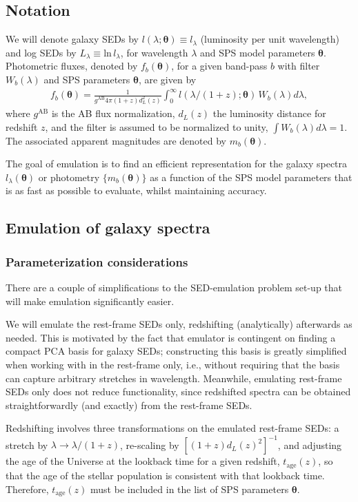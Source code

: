 \documentclass[twocolumn]{aastex62}
\def\btheta{\boldsymbol{\theta}}
\def\ln{\mathrm{ln}}
\begin{document}
\subsection{Notation}
\label{sec:sps}
%
We will denote galaxy SEDs by $l(\lambda; \btheta)\equiv l_\lambda$ (luminosity per unit wavelength) and log SEDs by $L_\lambda \equiv\ln\,l_\lambda$, for wavelength $\lambda$ and SPS model parameters $\btheta$. Photometric fluxes, denoted by $f_b(\btheta)$, for a given band-pass $b$ with filter $W_b(\lambda)$ and SPS parameters $\btheta$, are given by
\begin{align}
    f_b(\btheta) = \frac{1}{g^\mathrm{AB}4\pi (1+z)d_L^2(z)}\int_0^\infty l(\lambda/(1+z); \btheta)\,W_b(\lambda)d\lambda,
\end{align}
where $g^\mathrm{AB}$ is the AB flux normalization, $d_L(z)$ the luminosity distance for redshift $z$, and the filter is assumed to be normalized to unity, $\int W_b(\lambda)d\lambda = 1$. The associated apparent magnitudes are denoted by $m_b(\btheta)$.

The goal of emulation is to find an efficient representation for the galaxy spectra $l_\lambda(\btheta)$ or photometry $\{m_b(\btheta)\}$ as a function of the SPS model parameters that is as fast as possible to evaluate, whilst maintaining accuracy.
%
\subsection{Emulation of galaxy spectra}
\label{sec:emu}
%
\subsubsection{Parameterization considerations}
%
There are a couple of simplifications to the SED-emulation problem set-up that will make emulation significantly easier.

We will emulate the rest-frame SEDs only, redshifting (analytically) afterwards as needed. This is motivated by the fact that emulator is contingent on finding a compact PCA basis for galaxy SEDs; constructing this basis is greatly simplified when working with in the rest-frame only, i.e., without requiring that the basis can capture arbitrary stretches in wavelength. Meanwhile, emulating rest-frame SEDs only does not reduce functionality, since redshifted spectra can be obtained straightforwardly (and exactly) from the rest-frame SEDs.

Redshifting involves three transformations on the emulated rest-frame SEDs: a stretch by $\lambda\rightarrow\lambda/(1+z)$, re-scaling by $[(1+z)d_L(z)^2]^{-1}$, and adjusting the age of the Universe at the lookback time for a given redshift, $t_\mathrm{age}(z)$, so that the age of the stellar population is consistent with that lookback time. Therefore, $t_\mathrm{age}(z)$ must be included in the list of SPS parameters $\btheta$.
\end{document}
